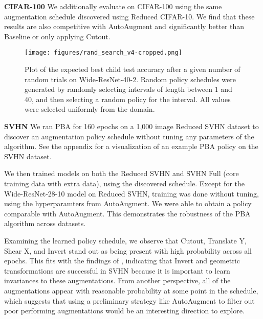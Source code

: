 \documentclass{article}
\begin{document}
\textbf{CIFAR-100}
We additionally evaluate on CIFAR-100 using the same augmentation schedule discovered using Reduced CIFAR-10. We find that these results are also competitive with AutoAugment and significantly better than Baseline or only applying Cutout.

\begin{figure}[t]
  \centering
  \texttt{[image: figures/rand\_search\_v4-cropped.png]}
  \caption{Plot of the expected best child test accuracy after a given number of random trials on Wide-ResNet-40-2. Random policy schedules were generated by randomly selecting intervals of length between 1 and 40, and then selecting a random policy for the interval. All values were selected uniformly from the domain.}
  \label{fig:random-search}
\end{figure}

\textbf{SVHN}
We ran PBA for 160 epochs on a 1,000 image Reduced SVHN dataset to discover an augmentation policy schedule without tuning any parameters of the algorithm. See the appendix for a visualization of an example PBA policy on the SVHN dataset. 

We then trained models on both the Reduced SVHN and SVHN Full (core training data with extra data), using the discovered schedule. Except for the Wide-ResNet-28-10 model on Reduced SVHN, training was done without tuning, using the hyperparamters from AutoAugment. We were able to obtain a policy comparable with AutoAugment. This demonstrates the robustness of the PBA algorithm across datasets.

Examining the learned policy schedule, we observe that Cutout, Translate Y, Shear X, and Invert stand out as being present with high probability across all epochs. This fits with the findings of \cite{autoaug}, indicating that Invert and geometric transformations are successful in SVHN because it is important to learn invariances to these augmentations. From another perspective, all of the augmentations appear with reasonable probability at some point in the schedule, which suggests that using a preliminary strategy like AutoAugment to filter out poor performing augmentations would be an interesting direction to explore.
\end{document}
